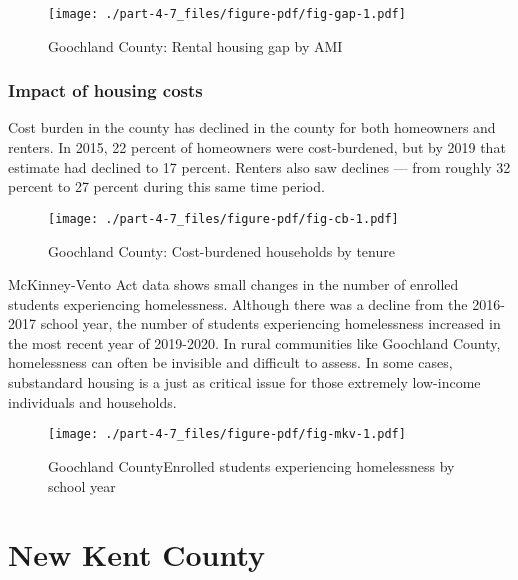 \documentclass[
  letterpaper,
  DIV=11,
  numbers=noendperiod]{scrreprt}
\begin{document}
\begin{figure}

{\centering \texttt{[image: ./part-4-7\_files/figure-pdf/fig-gap-1.pdf]}

}

\caption{\label{fig-gap}Goochland County: Rental housing gap by AMI}

\end{figure}

\hypertarget{impact-of-housing-costs-5}{%
\subsection{Impact of housing costs}\label{impact-of-housing-costs-5}}

Cost burden in the county has declined in the county for both homeowners
and renters. In 2015, 22 percent of homeowners were cost-burdened, but
by 2019 that estimate had declined to 17 percent. Renters also saw
declines --- from roughly 32 percent to 27 percent during this same time
period.

\begin{figure}

{\centering \texttt{[image: ./part-4-7\_files/figure-pdf/fig-cb-1.pdf]}

}

\caption{\label{fig-cb}Goochland County: Cost-burdened households by
tenure}

\end{figure}

McKinney-Vento Act data shows small changes in the number of enrolled
students experiencing homelessness. Although there was a decline from
the 2016-2017 school year, the number of students experiencing
homelessness increased in the most recent year of 2019-2020. In rural
communities like Goochland County, homelessness can often be invisible
and difficult to assess. In some cases, substandard housing is a just as
critical issue for those extremely low-income individuals and
households.

\begin{figure}

{\centering \texttt{[image: ./part-4-7\_files/figure-pdf/fig-mkv-1.pdf]}

}

\caption{\label{fig-mkv}Goochland CountyEnrolled students experiencing
homelessness by school year}

\end{figure}

\hypertarget{part-4-8}{%
\chapter{New Kent County}\label{part-4-8}}
\end{document}
